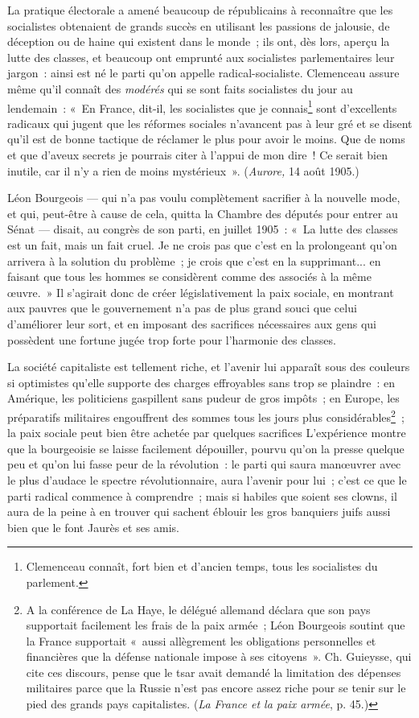 \documentclass[french,twoside]{book} %
\begin{document}
La pratique électorale a amené beaucoup de républicains à reconnaître que les socialistes obtenaient de grands succès en utilisant les passions de jalousie, de déception ou de haine qui existent dans le monde ; ils ont, dès lors, aperçu la lutte des classes, et beaucoup ont emprunté aux socialistes parlementaires leur jargon : ainsi est né le parti qu’on appelle radical-socialiste. Clemenceau assure même qu’il connaît des \emph{modérés} qui se sont faits socialistes du jour au lendemain : « En France, dit-il, les socialistes que je connais\footnote{ \noindent Clemenceau connaît, fort bien et d’ancien temps, tous les socialistes du parlement.
 } sont d’excellents radicaux qui jugent que les réformes sociales n’avancent pas à leur gré et se disent qu’il est de bonne tactique de réclamer le plus pour avoir le moins. Que de noms et que d’aveux secrets je pourrais citer à l’appui de mon dire ! Ce serait bien inutile, car il n’y a rien de moins mystérieux ». (\emph{Aurore,} 14 août 1905.)\par
 Léon Bourgeois — qui n’a pas voulu complètement sacrifier à la nouvelle mode, et qui, peut-être à cause de cela, quitta la Chambre des députés pour entrer au Sénat — disait, au congrès de son parti, en juillet 1905 : « La lutte des classes est un fait, mais un fait cruel. Je ne crois pas que c’est en la prolongeant qu’on arrivera à la solution du problème ; je crois que c’est en la supprimant... en faisant que tous les hommes se considèrent comme des associés à la même œuvre. » Il s’agirait donc de créer législativement la paix sociale, en montrant aux pauvres que le gouvernement n’a pas de plus grand souci que celui d’améliorer leur sort, et en imposant des sacrifices nécessaires aux gens qui possèdent une fortune jugée trop forte pour l’harmonie des classes.\par
La société capitaliste est tellement riche, et l’avenir lui apparaît sous des couleurs si optimistes qu’elle supporte des charges effroyables sans trop se plaindre : en Amérique, les politiciens gaspillent sans pudeur de gros impôts ; en Europe, les préparatifs militaires engouffrent des sommes tous les jours plus considérables\footnote{ \noindent A la conférence de La Haye, le délégué allemand déclara que son pays supportait facilement les frais de la paix armée ; Léon Bourgeois soutint que la France supportait « aussi allègrement les obligations personnelles et financières que la défense nationale impose à ses citoyens ». Ch. Guieysse, qui cite ces discours, pense que le tsar avait demandé la limitation des dépenses militaires parce que la Russie n’est pas encore assez riche pour se tenir sur le pied des grands pays capitalistes. (\emph{La France et la paix armée}, p. 45.)
 } ; la paix sociale peut bien être achetée par quelques sacrifices   L’expérience montre que la bourgeoisie se laisse facilement dépouiller, pourvu qu’on la presse quelque peu et qu’on lui fasse peur de la révolution : le parti qui saura manœuvrer avec le plus d’audace le spectre révolutionnaire, aura l’avenir pour lui ; c’est ce que le parti radical commence à comprendre ; mais si habiles que soient ses clowns, il aura de la peine à en trouver qui sachent éblouir les gros banquiers juifs aussi bien que le font Jaurès et ses amis.\par
\end{document}
